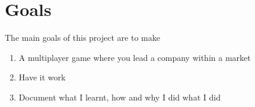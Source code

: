 \section{Goals}

The main goals of this project are to make
\begin{enumerate}
  \item{A multiplayer game where you lead a company within a market}
  \item{Have it work}
  \item{Document what I learnt, how and why I did what I did}
\end{enumerate}
